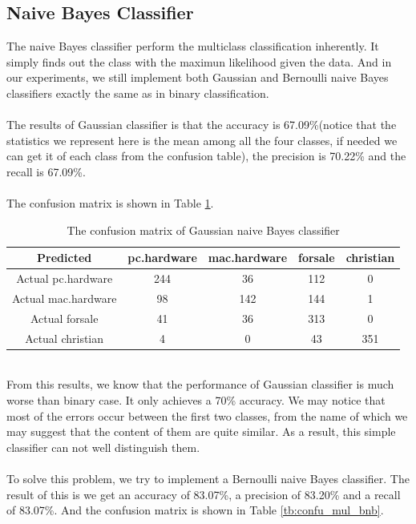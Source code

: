 \documentclass{article}
\begin{document}
\subsection{Naive Bayes Classifier}
The naive Bayes classifier perform the multiclass classification inherently. It simply finds out the class with the maximun likelihood given the data. And in our experiments, we still implement both Gaussian and Bernoulli naive Bayes classifiers exactly the same as in binary classification.\\
\\
The results of Gaussian classifier is that the accuracy is 67.09\%(notice that the statistics we represent here is the mean among all the four classes, if needed we can get it of each class from the confusion table), the precision is 70.22\% and the recall is 67.09\%.\\
\\
The confusion matrix is shown in Table \ref{tb:confu_mul_gnb}.\\
\begin{table}
\begin{center}
\caption{The confusion matrix of Gaussian naive Bayes classifier}
\label{tb:confu_mul_gnb}
\begin{tabular}{|c|c|c|c|c|}
\hline
Predicted&pc.hardware&mac.hardware&forsale&christian\\
\hline
Actual pc.hardware&244&36&112&0\\
\hline
Actual mac.hardware&98&142&144&1\\
\hline
Actual forsale&41&36&313&0\\
\hline
Actual christian&4&0&43&351\\
\hline
\end{tabular}
\end{center}
\end{table}
\\
From this results, we know that the performance of Gaussian classifier is much worse than binary case. It only achieves a 70\% accuracy. We may notice that most of the errors occur between the first two classes, from the name of which we may suggest that the content of them are quite similar. As a result, this simple classifier can not well distinguish them.\\
\\
To solve this problem, we try to implement a Bernoulli naive Bayes classifier. The result of this is we get an accuracy of 83.07\%, a precision of 83.20\% and a recall of 83.07\%. And the confusion matrix is shown in Table \ref{tb:confu_mul_bnb}.\\
\end{document}
